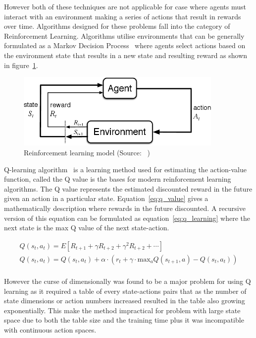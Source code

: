 However both of these techniques are not applicable for case where agents must interact with an environment making a
series of actions that result in rewards over time. Algorithms designed for these problems fall into the category of
Reinforcement Learning. Algorithms utilise environments that can be generally formulated as a Markov Decision
Process~\citep{Bel} where agents select actions based on the environment state that results in a new state and resulting
reward as shown in figure~\ref{fig:reinforcement_learning}.

\begin{figure}[h]
    \includegraphics[width=10cm]{figures/reinforcement_learning.png}
    \caption{Reinforcement learning model (Source: ~\cite{Sutton1998})}
    \label{fig:reinforcement_learning}
\end{figure}

Q-learning algorithm~\cite{watkins1992q-learning} is a learning method used for estimating the action-value function,
called the Q value is the bases for modern reinforcement learning algorithms. The Q value represents the estimated
discounted reward in the future given an action in a particular state. Equation~\eqref{eq:q_value} gives a
mathematically description where rewards in the future discounted. A recursive version of this equation can be
formulated as equation~\eqref{eq:q_learning} where the next state is the max Q value of the next state-action.

\begin{align}
    Q(s_t, a_t) = E[R_{t+1} + \gamma R_{t+2} + \gamma^2 R_{t+2} + \cdots ] \label{eq:q_value} \\
    Q(s_t, a_t) = Q(s_t, a_t) + \alpha \cdot (r_t + \gamma \cdot \text{max}_a Q(s_{t+1} , a) - Q(s_t, a_t) ) \label{eq:q_learning} \\
\end{align}

However the curse of dimensionally was found to be a major problem for using Q learning as it required a table of
every state-actions pairs that as the number of state dimensions or action numbers increased resulted in the table
also growing exponentially. This make the method impractical for problem with large state space due to both the table
size and the training time plus it was incompatible with continuous action spaces.

